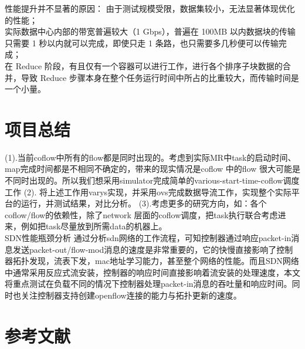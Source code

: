 \documentclass[a4paper, 11pt]{article}                                                   %
\begin{document}
\begin{CJK*}{UTF8}{song}
性能提升并不显著的原因：
由于测试规模受限，数据集较小，无法显著体现优化的性能；\\
实际数据中心内部的带宽普遍较大（1 Gbps），普遍在 100MB 以内数据块的传输只需要 1 秒以内就可以完成，即使只走 1 条路，也只需要多几秒便可以传输完成；\\
在 Reduce 阶段，有且仅有一个容器可以进行工作，进行各个排序子块数据的合并，导致 Reduce 步骤本身在整个任务运行时间中所占的比重较大，而传输时间是一个小量。

\section{项目总结}
(1).当前coflow中所有的flow都是同时出现的。考虑到实际MR中task的启动时间、map完成时间都是不相同不确定的，带来的现实情况是coflow 中的flow 很大可能是不同时出现的。所以我们想采用simulator完成简单的various-start-time-coflow调度工作
(2). 将上述工作用varys实现，并采用ovs完成数据导流工作，实现整个实际平台的运行，并测试结果，对比分析。
(3).考虑更多的研究方向，如：各个coflow/flow的依赖性，除了network 层面的coflow调度，把task执行联合考虑进来，例如把task尽量放到所需data的机器上。\\
SDN性能瓶颈分析
通过分析sdn网络的工作流程，可知控制器通过响应packet-in消息发送packet-out/flow-mod消息的速度是非常重要的，它的快慢直接影响了控制器拓扑发现，流表下发，mac地址学习能力，甚至整个网络的性能。而且SDN网络中通常采用反应式流安装，控制器的响应时间直接影响着流安装的处理速度，本文将重点测试在负载不同的情况下控制器处理packet-in消息的吞吐量和响应时间。同时也关注控制器支持创建openflow连接的能力与拓扑更新的速度。
\section{参考文献}






\end{CJK*}
\end{document}
